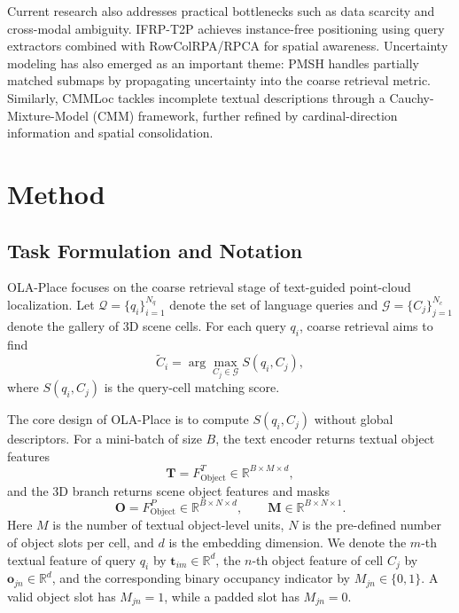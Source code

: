 \documentclass{article}
\begin{document}
Current research also addresses practical bottlenecks such as data scarcity and cross-modal ambiguity. IFRP-T2P \cite{wang2024instance} achieves instance-free positioning using query extractors combined with RowColRPA/RPCA for spatial awareness. Uncertainty modeling has also emerged as an important theme: PMSH \cite{feng2025partially} handles partially matched submaps by propagating uncertainty into the coarse retrieval metric. Similarly, CMMLoc \cite{xu2025cmmloc} tackles incomplete textual descriptions through a Cauchy-Mixture-Model (CMM) framework, further refined by cardinal-direction information and spatial consolidation.


\section{Method}

\subsection{Task Formulation and Notation}

OLA-Place focuses on the coarse retrieval stage of text-guided point-cloud localization. Let $\mathcal{Q}=\{q_i\}_{i=1}^{N_q}$ denote the set of language queries and $\mathcal{G}=\{C_j\}_{j=1}^{N_c}$ denote the gallery of 3D scene cells. For each query $q_i$, coarse retrieval aims to find
\begin{equation}
\widetilde{C}_i=\arg\max_{C_j\in\mathcal{G}} S(q_i,C_j),
\end{equation}
where $S(q_i,C_j)$ is the query-cell matching score.

The core design of OLA-Place is to compute $S(q_i,C_j)$ without global descriptors. For a mini-batch of size $B$, the text encoder returns textual object features
\begin{equation}
\mathbf{T}=F_{\mathrm{Object}}^{T}\in\mathbb{R}^{B\times M\times d},
\end{equation}
and the 3D branch returns scene object features and masks
\begin{equation}
\mathbf{O}=F_{\mathrm{Object}}^{P}\in\mathbb{R}^{B\times N\times d},
\qquad
\mathbf{M}\in\mathbb{R}^{B\times N\times 1}.
\end{equation}
Here $M$ is the number of textual object-level units, $N$ is the pre-defined number of object slots per cell, and $d$ is the embedding dimension. We denote the $m$-th textual feature of query $q_i$ by $\mathbf{t}_{im}\in\mathbb{R}^{d}$, the $n$-th object feature of cell $C_j$ by $\mathbf{o}_{jn}\in\mathbb{R}^{d}$, and the corresponding binary occupancy indicator by $M_{jn}\in\{0,1\}$. A valid object slot has $M_{jn}=1$, while a padded slot has $M_{jn}=0$.
\end{document}
